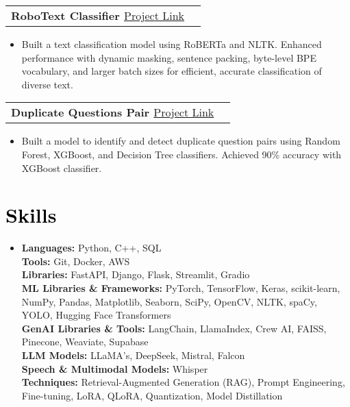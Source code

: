 \documentclass[letterpaper,11pt]{article}
\makeatletter
\newcommand{\resumeItem}[1]{
	\item\small{
		{#1 \vspace{-2pt}}
	}
}
\newcommand{\resumeProjectHeading}[1]{
	\item
	\begin{tabular*}{1.001\textwidth}{l@{\extracolsep{\fill}}r}
		\small#1 & \\
	\end{tabular*}\vspace{-7pt}
}
\newcommand{\resumeItemListStart}{\begin{itemize}}
\newcommand{\resumeItemListEnd}{\end{itemize}\vspace{-5pt}}
\makeatother
\begin{document}
		\resumeProjectHeading
	{\textbf{\large{{RoboText Classifier }}}\href{https://github.com/Dawoodsarfraz/RoboText-Classifier}{\normalsize{\color{blue} Project Link}}}
	\resumeItemListStart
	\resumeItem{\normalsize Built a text classification model using RoBERTa and NLTK. Enhanced performance with dynamic masking, sentence packing, byte-level BPE vocabulary, and larger batch sizes for efficient, accurate classification of diverse text.}
	\resumeItemListEnd
	\vspace{-15pt}
	
	
	\resumeProjectHeading
	{\textbf{\large{{Duplicate Questions Pair }}}\href{https://github.com/Dawoodsarfraz/duplicate-questions-pair}{\normalsize{\color{blue} Project Link}}}
	\resumeItemListStart
	\resumeItem{\normalsize Built a model to identify and detect duplicate question pairs using Random Forest, XGBoost, and Decision Tree classifiers. Achieved 90\% accuracy with XGBoost classifier.}
	\resumeItemListEnd
	\vspace{-15pt}
	
    
\section{\textcolor{black}{Skills}}
\begin{itemize}[leftmargin=0.01in, label={}]
    \item{
        \textbf{\normalsize{Languages:}} \normalsize{Python, C++, SQL} \\
        \textbf{\normalsize{Tools:}} \normalsize{Git, Docker, AWS} \\	
        \textbf{\normalsize{Libraries:}} \normalsize{FastAPI, Django, Flask, Streamlit, Gradio} \\	
        \textbf{\normalsize{ML Libraries \& Frameworks:}} \normalsize{PyTorch, TensorFlow, Keras, scikit-learn, NumPy, Pandas, Matplotlib, Seaborn, SciPy, OpenCV, NLTK, spaCy, YOLO, Hugging Face Transformers} \\
        \textbf{\normalsize{GenAI Libraries \& Tools:}} 
        \normalsize{LangChain, LlamaIndex, Crew AI, FAISS, Pinecone, Weaviate, Supabase} \\

        \textbf{\normalsize{LLM Models:}} 
        \normalsize{LLaMA's, DeepSeek, Mistral, Falcon} \\
        
        \textbf{\normalsize{Speech \& Multimodal Models:}} 
        \normalsize{Whisper} \\
        
        \textbf{\normalsize{Techniques:}} 
        \normalsize{Retrieval-Augmented Generation (RAG), Prompt Engineering, Fine-tuning, LoRA, QLoRA, Quantization, Model Distillation} \\
    
    }
\end{itemize}
\vspace{-10pt}
\end{document}
